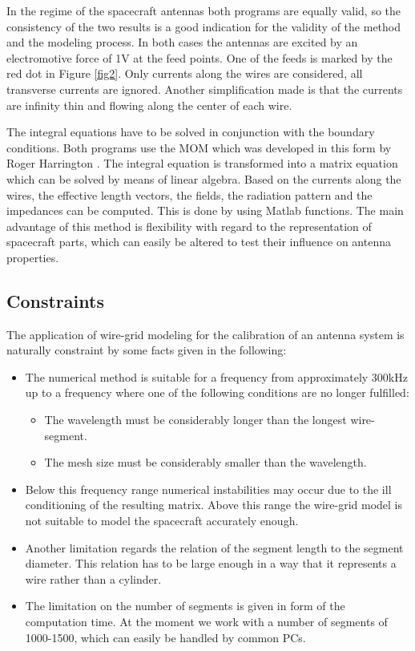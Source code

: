 \documentclass[a4paper,twocolumn]{esapub2005} %
\begin{document}
In the regime of the spacecraft antennas both programs are equally valid, so the consistency of the two results is a good indication for the validity of the method and the modeling process. In both cases  the antennas are excited by an electromotive force of 1V at the feed points. One of the feeds is marked by the red dot in Figure \ref{fig2}. Only currents along the wires are considered, all transverse currents are ignored. Another simplification made is that the currents are infinity thin and flowing along the center of each wire.

The integral equations have to be solved in conjunction with the boundary conditions. Both programs use the MOM which was developed in this form by Roger Harrington \cite{harrington}. The integral equation is transformed into a matrix equation which can be solved by means of linear algebra.
Based on the currents along the wires, the effective length vectors, the fields, the radiation pattern and the impedances can be computed. This is done by using Matlab functions. The main advantage of this method is flexibility with regard to the representation of spacecraft parts, which can easily be altered to test their influence on antenna properties.

\subsection{Constraints}
The application of wire-grid modeling for the calibration of an antenna system is naturally constraint by some facts given in the following:

\begin{itemize}
    \item The numerical method is suitable for a frequency from approximately 300kHz up to a frequency where one of the following conditions are no longer fulfilled:
\begin{itemize}
    \item The wavelength must be considerably longer than the longest wire-segment.
\item The mesh size must be considerably smaller than the wavelength.\end{itemize}
\item Below this frequency range numerical instabilities may occur due to the ill conditioning of the resulting matrix. Above this range the wire-grid model is not suitable to model the spacecraft accurately enough.
\item Another limitation regards the relation of the segment length to the segment diameter. This relation has to be large enough in a way that it represents a wire rather than a cylinder.
\item The limitation on the number of segments is given in form of the computation time. At the moment we work with a number of segments of 1000-1500, which can easily be handled by common PCs.
\end{itemize}
\end{document}
